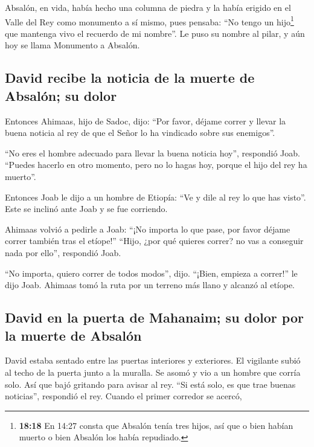  Absalón, en vida, había hecho una columna de piedra y la
había erigido en el Valle del Rey como monumento a sí mismo, pues
pensaba: ``No tengo un hijo\footnote{\textbf{18:18} En 14:27 consta que
  Absalón tenía tres hijos, así que o bien habían muerto o bien Absalón
  los había repudiado.} que mantenga vivo el recuerdo de mi nombre''. Le
puso su nombre al pilar, y aún hoy se llama Monumento a Absalón.

\hypertarget{david-recibe-la-noticia-de-la-muerte-de-absaluxf3n-su-dolor}{%
\subsection{David recibe la noticia de la muerte de Absalón; su
dolor}\label{david-recibe-la-noticia-de-la-muerte-de-absaluxf3n-su-dolor}}

 Entonces Ahimaas, hijo de Sadoc, dijo: ``Por favor,
déjame correr y llevar la buena noticia al rey de que el Señor lo ha
vindicado sobre sus enemigos''.

 ``No eres el hombre adecuado para llevar la buena
noticia hoy'', respondió Joab. ``Puedes hacerlo en otro momento, pero no
lo hagas hoy, porque el hijo del rey ha muerto''.

 Entonces Joab le dijo a un hombre de Etiopía: ``Ve y
dile al rey lo que has visto''. Este se inclinó ante Joab y se fue
corriendo.

 Ahimaas volvió a pedirle a Joab: ``¡No importa lo que
pase, por favor déjame correr también tras el etíope!'' ``Hijo, ¿por qué
quieres correr? no vas a conseguir nada por ello'', respondió Joab.

 ``No importa, quiero correr de todos modos'', dijo.
``¡Bien, empieza a correr!'' le dijo Joab. Ahimaas tomó la ruta por un
terreno más llano y alcanzó al etíope.

\hypertarget{david-en-la-puerta-de-mahanaim-su-dolor-por-la-muerte-de-absaluxf3n}{%
\subsection{David en la puerta de Mahanaim; su dolor por la muerte de
Absalón}\label{david-en-la-puerta-de-mahanaim-su-dolor-por-la-muerte-de-absaluxf3n}}

 David estaba sentado entre las puertas interiores y
exteriores. El vigilante subió al techo de la puerta junto a la muralla.
Se asomó y vio a un hombre que corría solo.  Así que bajó
gritando para avisar al rey. ``Si está solo, es que trae buenas
noticias'', respondió el rey. Cuando el primer corredor se acercó,


